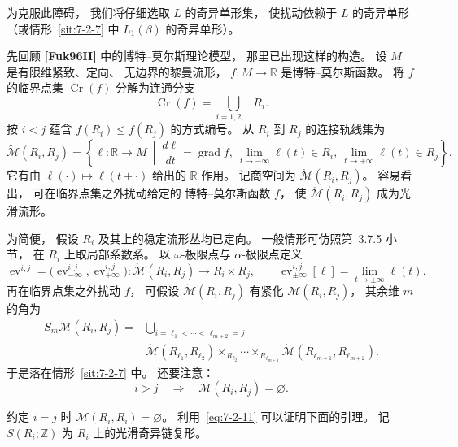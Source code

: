 为克服此障碍，
我们将仔细选取 $L$ 的奇异单形集，
使扰动依赖于 $L$ 的奇异单形
（或情形~\ref{sit:7-2-7} 中
$L_1(\beta)$ 的奇异单形）。

先回顾 \textbf{[Fuk96II]}
中的博特--莫尔斯理论模型，
那里已出现这样的构造。
设 $M$ 是有限维紧致、定向、
无边界的黎曼流形，
$f\colon M\to\mathbb R$
是博特--莫尔斯函数。
将 $f$ 的临界点集
$\operatorname{Cr}(f)$
分解为连通分支
\[
\operatorname{Cr}(f)
=\bigcup_{i=1,2,\ldots}R_i.
\]
按 $i<j$ 蕴含
$f(R_i)\le f(R_j)$ 的方式编号。
从 $R_i$ 到 $R_j$ 的连接轨线集为
\[
\widetilde{\mathcal M}(R_i,R_j)
=\left\{
\ell\colon\mathbb R\to M\ \middle|\
\frac{d\ell}{dt}=\operatorname{grad}f,
\ \lim_{t\to-\infty}\ell(t)\in R_i,
\ \lim_{t\to+\infty}\ell(t)\in R_j
\right\}.
\]
它有由
$\ell(\cdot)\mapsto\ell(t+\cdot)$
给出的 $\mathbb R$ 作用。
记商空间为
$\mathring{\mathcal M}(R_i,R_j)$。
容易看出，
可在临界点集之外扰动给定的
博特--莫尔斯函数 $f$，
使 $\mathring{\mathcal M}(R_i,R_j)$
成为光滑流形。

为简便，
假设 $R_i$ 及其上的稳定流形丛均已定向。
一般情形可仿照第~3.7.5 小节，
在 $R_i$ 上取局部系数系。
以 $\omega$-极限点与 $\alpha$-极限点定义
\[
\operatorname{ev}^{i,j}
=\bigl(\operatorname{ev}^{i,j}_{-\infty},
\operatorname{ev}^{i,j}_{+\infty}\bigr)
\colon\mathring{\mathcal M}(R_i,R_j)
\longrightarrow R_i\times R_j,
\qquad
\operatorname{ev}^{i,j}_{\pm\infty}[\ell]
=\lim_{t\to\pm\infty}\ell(t).
\]
再在临界点集之外扰动 $f$，
可假设
$\mathring{\mathcal M}(R_i,R_j)$
有紧化 $\mathcal M(R_i,R_j)$，
其余维 $m$ 的角为
\begin{equation}
\begin{aligned}
S_m\mathcal M(R_i,R_j)
={}&\bigcup_{i=\ell_1<\cdots<\ell_{m+2}=j}\\
&\mathring{\mathcal M}(R_{\ell_1},R_{\ell_2})
\mathop{\times}_{R_{\ell_2}}\cdots
\mathop{\times}_{R_{\ell_{m+1}}}
\mathring{\mathcal M}(R_{\ell_{m+1}},R_{\ell_{m+2}}).
\end{aligned}
\tag{7.2.10}\label{eq:7-2-10}
\end{equation}
于是落在情形~\ref{sit:7-2-7} 中。
还要注意：
\begin{equation}
i>j\quad\Longrightarrow\quad
\mathcal M(R_i,R_j)=\varnothing.
\tag{7.2.11}\label{eq:7-2-11}
\end{equation}

约定 $i=j$ 时
$\mathcal M(R_i,R_i)=\varnothing$。
利用~\eqref{eq:7-2-11}
可以证明下面的引理。
记 $S(R_i;\mathbb Z)$ 为
$R_i$ 上的光滑奇异链复形。

